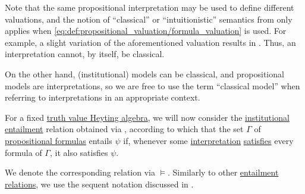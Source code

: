 \begin{remark}\label{rem:classical_propositional_interpretations}
  Note that the same propositional interpretation may be used to define different valuations, and the notion of \enquote{classical} or \enquote{intuitionistic} semantics from  only applies when \eqref{eq:def:propositional_valuation/formula_valuation} is used. For example, a slight variation of the aforementioned valuation results in . Thus, an interpretation cannot, by itself, be classical.

  On the other hand, (institutional) models can be classical, and propositional models are interpretations, so we are free to use the term \enquote{classical model} when referring to interpretations in an appropriate context.
\end{remark}

\begin{definition}\label{def:propositional_entailment}\mimprovised
  For a fixed \hyperref[def:truth_value_algebra]{truth value Heyting algebra}, we will now consider the \hyperref[def:institutional_entailment]{institutional entailment} relation obtained via , according to which that the set \( \Gamma \) of \hyperref[def:propositional_syntax/formula]{propositional formulas} entails \( \psi \) if, whenever some \hyperref[def:propositional_valuation/interpretation]{interpretation} \hyperref[thm:propositional_institution/satisfaction]{satisfies} every formula of \( \Gamma \), it also satisfies \( \psi \).

  We denote the corresponding relation via \( {\vDash} \). Similarly to other \hyperref[def:entailment_system/entailment]{entailment relations}, we use the sequent notation discussed in .
\end{definition}

